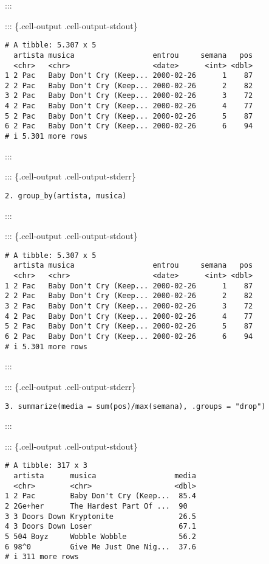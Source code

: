 \documentclass[
  letterpaper,
  DIV=11,
  numbers=noendperiod]{scrreprt}
\begin{document}
\begin{itemize}
  :::

  ::: \{.cell-output .cell-output-stdout\}

\begin{verbatim}
# A tibble: 5.307 x 5
  artista musica                  entrou     semana   pos
  <chr>   <chr>                   <date>      <int> <dbl>
1 2 Pac   Baby Don't Cry (Keep... 2000-02-26      1    87
2 2 Pac   Baby Don't Cry (Keep... 2000-02-26      2    82
3 2 Pac   Baby Don't Cry (Keep... 2000-02-26      3    72
4 2 Pac   Baby Don't Cry (Keep... 2000-02-26      4    77
5 2 Pac   Baby Don't Cry (Keep... 2000-02-26      5    87
6 2 Pac   Baby Don't Cry (Keep... 2000-02-26      6    94
# i 5.301 more rows
\end{verbatim}

  :::

  ::: \{.cell-output .cell-output-stderr\}

\begin{verbatim}
2. group_by(artista, musica)
\end{verbatim}

  :::

  ::: \{.cell-output .cell-output-stdout\}

\begin{verbatim}
# A tibble: 5.307 x 5
  artista musica                  entrou     semana   pos
  <chr>   <chr>                   <date>      <int> <dbl>
1 2 Pac   Baby Don't Cry (Keep... 2000-02-26      1    87
2 2 Pac   Baby Don't Cry (Keep... 2000-02-26      2    82
3 2 Pac   Baby Don't Cry (Keep... 2000-02-26      3    72
4 2 Pac   Baby Don't Cry (Keep... 2000-02-26      4    77
5 2 Pac   Baby Don't Cry (Keep... 2000-02-26      5    87
6 2 Pac   Baby Don't Cry (Keep... 2000-02-26      6    94
# i 5.301 more rows
\end{verbatim}

  :::

  ::: \{.cell-output .cell-output-stderr\}

\begin{verbatim}
3. summarize(media = sum(pos)/max(semana), .groups = "drop")
\end{verbatim}

  :::

  ::: \{.cell-output .cell-output-stdout\}

\begin{verbatim}
# A tibble: 317 x 3
  artista      musica                  media
  <chr>        <chr>                   <dbl>
1 2 Pac        Baby Don't Cry (Keep...  85.4
2 2Ge+her      The Hardest Part Of ...  90  
3 3 Doors Down Kryptonite               26.5
4 3 Doors Down Loser                    67.1
5 504 Boyz     Wobble Wobble            56.2
6 98^0         Give Me Just One Nig...  37.6
# i 311 more rows
\end{verbatim}


\end{itemize}
\end{document}
